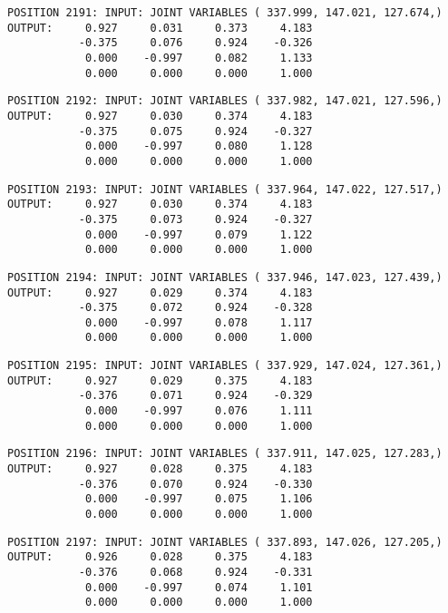 \begin{verbatim}
POSITION 2191: INPUT: JOINT VARIABLES ( 337.999, 147.021, 127.674,)
OUTPUT:     0.927     0.031     0.373     4.183
           -0.375     0.076     0.924    -0.326
            0.000    -0.997     0.082     1.133
            0.000     0.000     0.000     1.000
\end{verbatim} \pagebreak[1]\begin{verbatim}
POSITION 2192: INPUT: JOINT VARIABLES ( 337.982, 147.021, 127.596,)
OUTPUT:     0.927     0.030     0.374     4.183
           -0.375     0.075     0.924    -0.327
            0.000    -0.997     0.080     1.128
            0.000     0.000     0.000     1.000
\end{verbatim} \pagebreak[1]\begin{verbatim}
POSITION 2193: INPUT: JOINT VARIABLES ( 337.964, 147.022, 127.517,)
OUTPUT:     0.927     0.030     0.374     4.183
           -0.375     0.073     0.924    -0.327
            0.000    -0.997     0.079     1.122
            0.000     0.000     0.000     1.000
\end{verbatim} \pagebreak[1]\begin{verbatim}
POSITION 2194: INPUT: JOINT VARIABLES ( 337.946, 147.023, 127.439,)
OUTPUT:     0.927     0.029     0.374     4.183
           -0.375     0.072     0.924    -0.328
            0.000    -0.997     0.078     1.117
            0.000     0.000     0.000     1.000
\end{verbatim} \pagebreak[1]\begin{verbatim}
POSITION 2195: INPUT: JOINT VARIABLES ( 337.929, 147.024, 127.361,)
OUTPUT:     0.927     0.029     0.375     4.183
           -0.376     0.071     0.924    -0.329
            0.000    -0.997     0.076     1.111
            0.000     0.000     0.000     1.000
\end{verbatim} \pagebreak[1]\begin{verbatim}
POSITION 2196: INPUT: JOINT VARIABLES ( 337.911, 147.025, 127.283,)
OUTPUT:     0.927     0.028     0.375     4.183
           -0.376     0.070     0.924    -0.330
            0.000    -0.997     0.075     1.106
            0.000     0.000     0.000     1.000
\end{verbatim} \pagebreak[1]\begin{verbatim}
POSITION 2197: INPUT: JOINT VARIABLES ( 337.893, 147.026, 127.205,)
OUTPUT:     0.926     0.028     0.375     4.183
           -0.376     0.068     0.924    -0.331
            0.000    -0.997     0.074     1.101
            0.000     0.000     0.000     1.000
\end{verbatim} \pagebreak[1]\begin{verbatim}

\end{verbatim}
